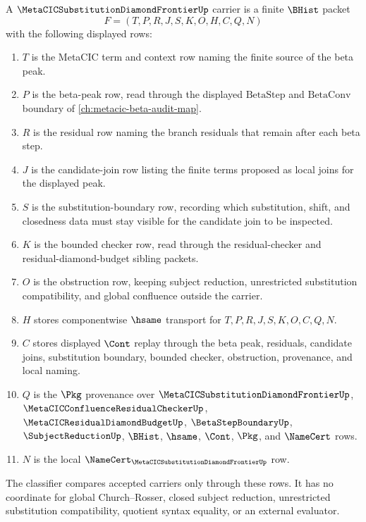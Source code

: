 \begin{definition}
\label{def:metacic-substitution-diamond-frontier-carrier}
A $\MetaCICSubstitutionDiamondFrontierUp$ carrier is a finite $\BHist$ packet
$$
F=(T,P,R,J,S,K,O,H,C,Q,N)
$$
with the following displayed rows:
\begin{enumerate}
\item $T$ is the MetaCIC term and context row naming the finite source of the beta peak.
\item $P$ is the beta-peak row, read through the displayed $\mathrm{BetaStep}$ and $\mathrm{BetaConv}$ boundary of \autoref{ch:metacic-beta-audit-map}.
\item $R$ is the residual row naming the branch residuals that remain after each beta step.
\item $J$ is the candidate-join row listing the finite terms proposed as local joins for the displayed peak.
\item $S$ is the substitution-boundary row, recording which substitution, shift, and closedness data must stay visible for the candidate join to be inspected.
\item $K$ is the bounded checker row, read through the residual-checker and residual-diamond-budget sibling packets.
\item $O$ is the obstruction row, keeping subject reduction, unrestricted substitution compatibility, and global confluence outside the carrier.
\item $H$ stores componentwise $\hsame$ transport for $T,P,R,J,S,K,O,C,Q,N$.
\item $C$ stores displayed $\Cont$ replay through the beta peak, residuals, candidate joins, substitution boundary, bounded checker, obstruction, provenance, and local naming.
\item $Q$ is the $\Pkg$ provenance over $\MetaCICSubstitutionDiamondFrontierUp$, $\MetaCICConfluenceResidualCheckerUp$, $\MetaCICResidualDiamondBudgetUp$, $\BetaStepBoundaryUp$, $\SubjectReductionUp$, $\BHist$, $\hsame$, $\Cont$, $\Pkg$, and $\NameCert$ rows.
\item $N$ is the local $\NameCert_{\MetaCICSubstitutionDiamondFrontierUp}$ row.
\end{enumerate}
The classifier compares accepted carriers only through these rows. It has no coordinate for global Church--Rosser, closed subject reduction, unrestricted substitution compatibility, quotient syntax equality, or an external evaluator.
\end{definition}

